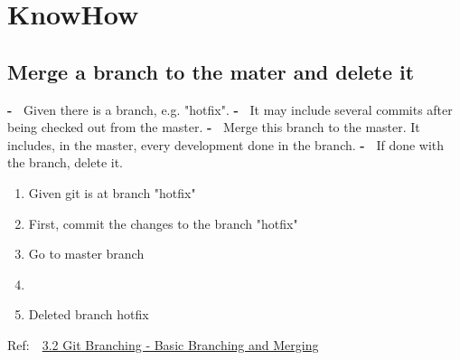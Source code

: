 \np
\section{KnowHow}\label{sec:howto}

\subsection{Merge a branch to the mater and delete it} 
\nl\textbf{-~} Given there is a branch, e.g. "hotfix".
\nl\textbf{-~} It may include several commits after being checked out from the master.
\nl\textbf{-~} Merge this branch to the master. It includes, in the master, every development done in the branch. 
\nl\textbf{-~} If done  with the branch, delete it.
\begin{enumerate}\packed
\item Given git is at branch "hotfix"
\item {}  \hspace{12pt} First, commit the changes to the branch "hotfix"
\item {}  \hspace{12pt} Go to master branch
\item {}
\item {} \hspace{12pt} Deleted branch hotfix
\end{enumerate}
Ref:~~\href{https://git-scm.com/book/en/v2/Git-Branching-Basic-Branching-and-Merging}{3.2 Git Branching - Basic Branching and Merging}
